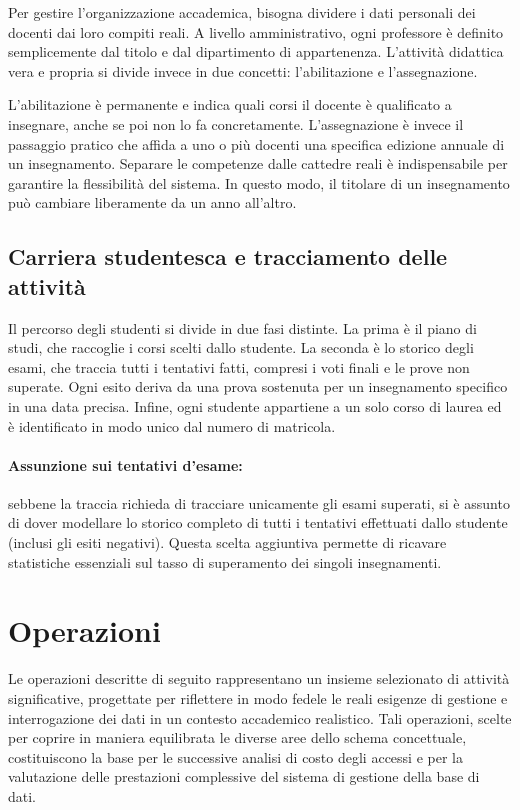 Per gestire l'organizzazione accademica, bisogna dividere i dati personali dei docenti dai loro compiti reali.
A livello amministrativo, ogni professore è definito semplicemente dal titolo e dal dipartimento di appartenenza.
L'attività didattica vera e propria si divide invece in due concetti: l'abilitazione e l'assegnazione.

L'abilitazione è permanente e indica quali corsi il docente è qualificato a insegnare, anche se poi non lo fa concretamente.
L'assegnazione è invece il passaggio pratico che affida a uno o più docenti una specifica edizione annuale di un insegnamento.
Separare le competenze dalle cattedre reali è indispensabile per garantire la flessibilità del sistema. In questo modo, il titolare di un insegnamento può cambiare liberamente da un anno all'altro.

\subsection{Carriera studentesca e tracciamento delle attività}
\label{ssec:carriera-studentesca-e-tracciamento-delle-attivita}

Il percorso degli studenti si divide in due fasi distinte.
La prima è il piano di studi, che raccoglie i corsi scelti dallo studente.
La seconda è lo storico degli esami, che traccia tutti i tentativi fatti, compresi i voti finali e le prove non superate.
Ogni esito deriva da una prova sostenuta per un insegnamento specifico in una data precisa.
Infine, ogni studente appartiene a un solo corso di laurea ed è identificato in modo unico dal numero di matricola.

\paragraph{Assunzione sui tentativi d'esame:} sebbene la traccia richieda di tracciare unicamente gli esami superati, si è assunto di dover modellare lo storico completo di tutti i tentativi effettuati dallo studente (inclusi gli esiti negativi). Questa scelta aggiuntiva permette di ricavare statistiche essenziali sul tasso di superamento dei singoli insegnamenti.

\newpage
\section{Operazioni}
\label{sec:operazioni}

Le operazioni descritte di seguito rappresentano un insieme selezionato di attività significative,
progettate per riflettere in modo fedele le reali esigenze di gestione
e interrogazione dei dati in un contesto accademico realistico.
Tali operazioni, scelte per coprire in maniera equilibrata le diverse aree dello schema concettuale,
costituiscono la base per le successive analisi di costo degli accessi
e per la valutazione delle prestazioni complessive del sistema di gestione della base di dati.

